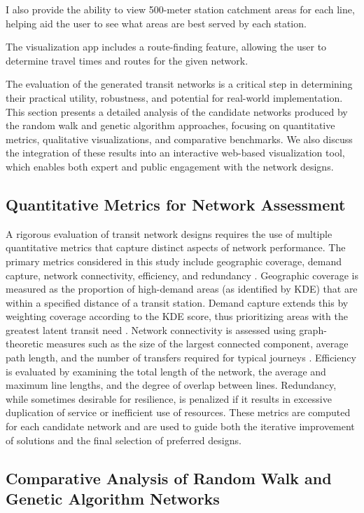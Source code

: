 \documentclass[manuscript]{acmart}
\begin{document}
I also provide the ability to view 500-meter station catchment areas for each line, helping aid the user to see what areas are best served by each station.

The visualization app includes a route-finding feature, allowing the user to determine travel times and routes for the given network.

The evaluation of the generated transit networks is a critical step in determining their practical utility, robustness, and potential for real-world implementation. This section presents a detailed analysis of the candidate networks produced by the random walk and genetic algorithm approaches, focusing on quantitative metrics, qualitative visualizations, and comparative benchmarks. We also discuss the integration of these results into an interactive web-based visualization tool, which enables both expert and public engagement with the network designs.

\subsection{Quantitative Metrics for Network Assessment}
A rigorous evaluation of transit network designs requires the use of multiple quantitative metrics that capture distinct aspects of network performance. The primary metrics considered in this study include geographic coverage, demand capture, network connectivity, efficiency, and redundancy \cite{bib:bast2016route, bib:overview-field}. Geographic coverage is measured as the proportion of high-demand areas (as identified by KDE) that are within a specified distance of a transit station. Demand capture extends this by weighting coverage according to the KDE score, thus prioritizing areas with the greatest latent transit need \cite{bib:silverman1986density}. Network connectivity is assessed using graph-theoretic measures such as the size of the largest connected component, average path length, and the number of transfers required for typical journeys \cite{bib:bast2016route}. Efficiency is evaluated by examining the total length of the network, the average and maximum line lengths, and the degree of overlap between lines. Redundancy, while sometimes desirable for resilience, is penalized if it results in excessive duplication of service or inefficient use of resources. These metrics are computed for each candidate network and are used to guide both the iterative improvement of solutions and the final selection of preferred designs.

\subsection{Comparative Analysis of Random Walk and Genetic Algorithm Networks}
\end{document}

